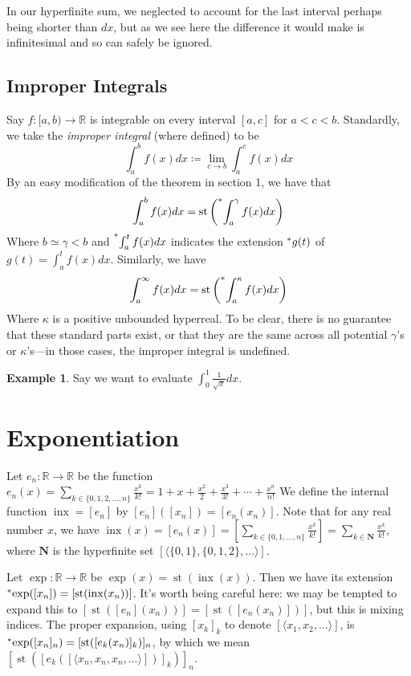 \documentclass{article}
\newcommand{\stp}[1]{\st\left(#1\right)}
\newcommand{\reals}{\mathbb{R}}
\newcommand{\hr}[1]{\prescript{*}{}{#1}}
\DeclareMathOperator{\st}{st}
\DeclareMathOperator{\inx}{inx}
\theoremstyle{definition}
\newtheorem*{example}{Example}
\begin{document}
In our hyperfinite sum, we neglected to account for the last interval perhaps being shorter than $dx$, but as we see here the difference it would make is infinitesimal and so can safely be ignored.

\subsection{Improper Integrals}
Say $f: [a, b) \to \reals$ is integrable on every interval $[a, c]$ for $a < c < b$. Standardly, we take the \textit{improper integral} (where defined) to be
\[\int_a^b f(x)dx \coloneq \lim_{c \to b} \int_a^c f(x)dx\]
By an easy modification of the theorem in section 1, we have that
\[\int_a^b f(x)dx = \stp{\hr{\int_a^\gamma f(x)dx}}\]
Where $b \simeq \gamma < b$ and $\hr{\int_a^t f(x)dx}$ indicates the extension $\hr{g}(t)$ of $g(t) = \int_a^t f(x)dx$. Similarly, we have
\[\int_a^\infty f(x)dx = \stp{\hr{\int_a^\kappa f(x)dx}}\]
Where $\kappa$ is a positive unbounded hyperreal. To be clear, there is no guarantee that these standard parts exist, or that they are the same across all potential $\gamma$'s or $\kappa$'s---in those cases, the improper integral is undefined.

\begin{example}
    Say we want to evaluate $\int_0^1 \frac{1}{\sqrt{x}} dx$. 
\end{example}

\section{Exponentiation}

Let $e_n: \reals \to \reals$ be the function $e_n(x) = \sum_{k \in \{0, 1, 2, \ldots, n\}} \frac{x^k}{k!} = 1 + x + \frac{x^2}{2} + \frac{x^3}{3!} + \cdots + \frac{x^n}{n!}$ We define the internal function $\inx = [e_n]$ by $[e_n]([x_n]) = [e_n(x_n)]$. Note that for any real number $x$, we have $\inx(x) = [e_n(x)] = [\sum_{k \in \{0, 1, \ldots, n\}} \frac{x^k}{k!}] = \sum_{k \in \mathbf{N}} \frac{x^k}{k!}$, where $\mathbf{N}$ is the hyperfinite set $[\langle \{0, 1\}, \{0, 1, 2\}, \ldots \rangle]$. 

Let $\exp: \reals \to \reals$ be $\exp(x) = \st(\inx(x))$. Then we have its extension $\hr{\exp}([x_n]) = [\st(\inx(x_n))]$. It's worth being careful here: we may be tempted to expand this to $[\st([e_n](x_n))] = [\st([e_n(x_n)])]$, but this is mixing indices. The proper expansion, using $[x_k]_k$ to denote $[\langle x_1, x_2, \ldots \rangle]$, is $\hr{\exp}([x_n]_n) = [\st([e_k(x_n)]_k)]_n$, by which we mean $[\st([e_k([\langle x_n, x_n, x_n, \ldots \rangle])]_k)]_n$.
\end{document}
